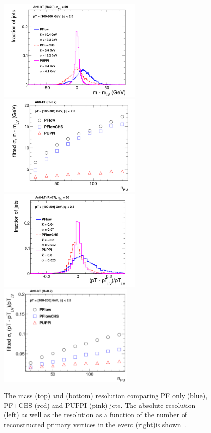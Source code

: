 \begin{figure}[h] 
    \centering
    \includegraphics[height=5cm]{figures/event_reconstruction/puppi_mres_hiPt.pdf}
    \includegraphics[height=5cm]{figures/event_reconstruction/puppi_mresVsPu.pdf}\\
    \includegraphics[height=5cm]{figures/event_reconstruction/puppi_ptres_hiPt.pdf}
    \includegraphics[height=5cm]{figures/event_reconstruction/puppi_ptresVsPu.pdf}
    \caption{The mass (top) and \PT (bottom) resolution comparing PF only (blue), PF+CHS (red) and PUPPI (pink) jets. The absolute resolution (left) as well as the resolution as a function of the number of reconstructed primary vertices in the event (right)is shown~\cite{Bertolini2014}.}
    \label{fig:objreco:puppi}
\end{figure}

